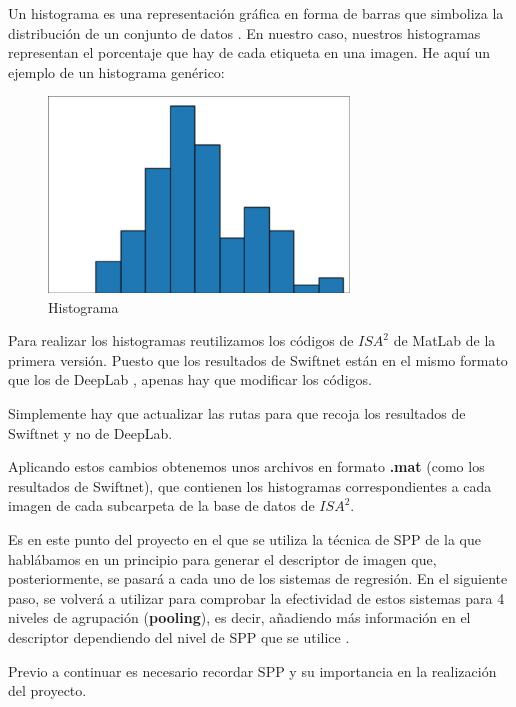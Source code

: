 Un histograma es una representación gráfica en forma de barras que simboliza la distribución de un conjunto de datos \cite{histograma}. En nuestro caso, nuestros histogramas representan el porcentaje que hay de cada etiqueta en una imagen. He aquí un ejemplo de un histograma genérico:

\begin{figure}[H]
  \centering
  \includegraphics[width=8cm]{Figuras/histograma.eps}
  \caption{Histograma}
\end{figure}

Para realizar los histogramas reutilizamos los códigos de $ISA^{2}$ \cite{isa2} de MatLab de la primera versión. Puesto que los resultados de Swiftnet están en el mismo formato que los de DeepLab \cite{deeplab}, apenas hay que modificar los códigos.

Simplemente hay que actualizar las rutas para que recoja los resultados de Swiftnet y no de DeepLab.

Aplicando estos cambios obtenemos unos archivos en formato \textbf{.mat} (como los resultados de Swiftnet), que contienen los histogramas correspondientes a cada imagen de cada subcarpeta de la base de datos de $ISA^{2}$.

Es en este punto del proyecto en el que se utiliza la técnica de \ac{SPP} \cite{spp} de la que hablábamos en un principio para generar el descriptor de imagen que, posteriormente, se pasará a cada uno de los sistemas de regresión. En el siguiente paso, se volverá a utilizar para comprobar la efectividad de estos sistemas para 4 niveles de agrupación (\textbf{pooling}), es decir, añadiendo más información en el descriptor dependiendo del nivel de \ac{SPP} que se utilice \cite{isa2}.

Previo a continuar es necesario recordar \ac{SPP} y su importancia en la realización del proyecto.


